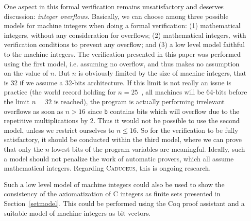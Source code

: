 \documentclass[a4paper]{llncs}
\newcommand{\caduceus}{\textsc{Caduceus}}
\begin{document}
One aspect in this formal verification
remains unsatisfactory and deserves discussion: \emph{integer
  overflows}. Basically, we can 
choose among three possible models for machine integers when doing a
formal verification: (1) mathematical integers, without any
consideration for overflows; (2) mathematical integers, with
verification conditions to prevent any overflow; and (3) a low level
model faithful to the machine integers. The verification presented in
this paper was performed using the first model, i.e. assuming no
overflow, and thus makes no assumption on the value of $n$. But 
$n$ is obviously limited by the size of machine integers, that is 32 if we
assume a 32-bits architecture. If this limit is not really an issue is
practice (the world record holding for $n=25$~\cite{nqueensrecord},
all machines will be 64-bits before the limit $n=32$ is reached), 
the program is actually performing irrelevant overflows as soon as
$n>16$ since \texttt{b} contains bits which will overflow
due to the repetitive multiplications by 2. Thus it would not be
possible to use the second model, unless we restrict ourselves to
$n\le 16$. So for the verification to be fully satisfactory, it should
be conducted within the third model, where we can prove that only the
$n$ lowest bits of the program variables are meaningful. Ideally, such a model
should not penalize the work of automatic provers, which all assume
mathematical integers. Regarding \caduceus, this is ongoing research.

Such a low level model of machine integers could also be used to
show the consistency of the axiomatization of C integers as finite
sets presented in Section~\ref{setmodel}.
This could be performed using the Coq proof assistant and a suitable
model of machine integers as bit vectors.


\nocite{*}



\appendix
\end{document}
